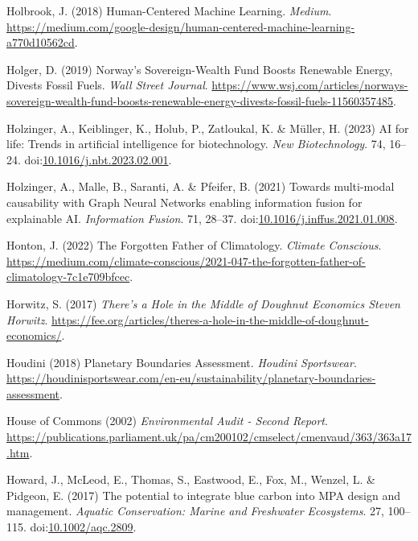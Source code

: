 \documentclass[
  letterpaper,
  DIV=11,
  numbers=noendperiod]{scrartcl}
\newlength{\cslhangindent}
\newenvironment{CSLReferences}[2] %
 {\begin{list}{}{%
  \setlength{\itemindent}{0pt}
  \setlength{\leftmargin}{0pt}
  \setlength{\parsep}{0pt}
  \ifodd #1
   \setlength{\leftmargin}{\cslhangindent}
   \setlength{\itemindent}{-1\cslhangindent}
  \fi
  \setlength{\itemsep}{#2\baselineskip}}}
 {\end{list}}
\begin{document}
\begin{CSLReferences}{0}{1}
Holbrook, J. (2018) Human-{Centered Machine Learning}. \emph{Medium}.
\url{https://medium.com/google-design/human-centered-machine-learning-a770d10562cd}.

Holger, D. (2019) Norway's {Sovereign-Wealth Fund Boosts Renewable
Energy}, {Divests Fossil Fuels}. \emph{Wall Street Journal}.
\url{https://www.wsj.com/articles/norways-sovereign-wealth-fund-boosts-renewable-energy-divests-fossil-fuels-11560357485}.

Holzinger, A., Keiblinger, K., Holub, P., Zatloukal, K. \& Müller, H.
(2023) {AI} for life: {Trends} in artificial intelligence for
biotechnology. \emph{New Biotechnology}. 74, 16--24.
doi:\href{https://doi.org/10.1016/j.nbt.2023.02.001}{10.1016/j.nbt.2023.02.001}.

Holzinger, A., Malle, B., Saranti, A. \& Pfeifer, B. (2021) Towards
multi-modal causability with {Graph Neural Networks} enabling
information fusion for explainable {AI}. \emph{Information Fusion}. 71,
28--37.
doi:\href{https://doi.org/10.1016/j.inffus.2021.01.008}{10.1016/j.inffus.2021.01.008}.

Honton, J. (2022) The {Forgotten Father} of {Climatology}. \emph{Climate
Conscious}.
\url{https://medium.com/climate-conscious/2021-047-the-forgotten-father-of-climatology-7c1e709bfcec}.

Horwitz, S. (2017) \emph{There's a {Hole} in the {Middle} of {Doughnut
Economics} {\textbar} {Steven Horwitz}}.
\url{https://fee.org/articles/theres-a-hole-in-the-middle-of-doughnut-economics/}.

Houdini (2018) Planetary {Boundaries Assessment}. \emph{Houdini
Sportswear}.
\url{https://houdinisportswear.com/en-eu/sustainability/planetary-boundaries-assessment}.

House of Commons (2002) \emph{Environmental {Audit} - {Second Report}}.
\url{https://publications.parliament.uk/pa/cm200102/cmselect/cmenvaud/363/363a17.htm}.

Howard, J., McLeod, E., Thomas, S., Eastwood, E., Fox, M., Wenzel, L. \&
Pidgeon, E. (2017) The potential to integrate blue carbon into {MPA}
design and management. \emph{Aquatic Conservation: Marine and Freshwater
Ecosystems}. 27, 100--115.
doi:\href{https://doi.org/10.1002/aqc.2809}{10.1002/aqc.2809}.


\end{CSLReferences}
\end{document}
